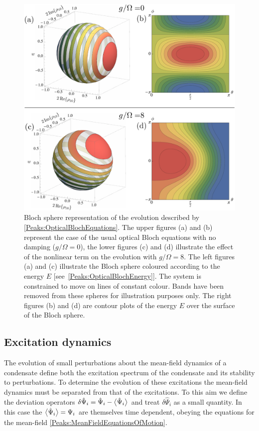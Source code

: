 \begin{figure}
    \centering
    \includegraphics[width=14cm]{BlochSpheres}
    \caption{Bloch sphere representation of the evolution described by \eqref{Peaks:OpticalBlochEquations}. The upper figures (a) and (b) represent the case of the usual optical Bloch equations with no damping ($g/\Omega=0$), the lower figures (c) and (d) illustrate the effect of the nonlinear term on the evolution with $g/\Omega = 8$. The left figures (a) and (c) illustrate the Bloch sphere coloured according to the energy $E$ [see~\eqref{Peaks:OpticalBlochEnergy}]. The system is constrained to move on lines of constant colour. Bands have been removed from these spheres for illustration purposes only. The right figures (b) and (d) are contour plots of the energy $E$ over the surface of the Bloch sphere.
     \label{Peaks:BlochSphere}}
\end{figure}

\subsection{Excitation dynamics}

The evolution of small perturbations about the mean-field dynamics of a condensate define both the excitation spectrum of the condensate and its stability to perturbations. 
To determine the evolution of these excitations the mean-field dynamics must be separated from that of the excitations. To this aim we define the deviation operators $\delta\hat{\Psi}_i = \hat{\Psi}_i - {\big<\hat{\Psi}_i\big>}$ and treat $\delta\hat{\Psi}_i$ as a small quantity. In this case the ${\big<\hat{\Psi}_i\big>}=\Psi_i$ are themselves time dependent, obeying the equations for the mean-field \eqref{Peaks:MeanFieldEquationsOfMotion}.


